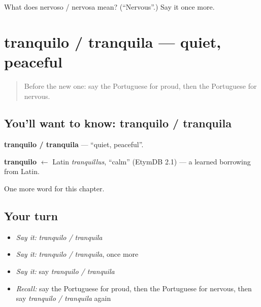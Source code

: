 \begin{tcolorbox}[breakable,colback=teal!4,colframe=teal!35!black,title={Before you move on}]
What does nervoso / nervosa mean? (\textquotedblleft{}Nervous\textquotedblright{}.) Say it once more.
\end{tcolorbox}
\section[tranquilo / tranquila]{tranquilo / tranquila — quiet, peaceful}

\label{lesson:PT-C215-tranquilo-tranquila}



\begin{quote}
Before the new one: say the Portuguese for proud, then the Portuguese for nervous.
\end{quote}

\subsection*{You'll want to know: tranquilo / tranquila}
\textbf{tranquilo / tranquila} — \textquotedblleft{}quiet, peaceful\textquotedblright{}.

\begin{cousinweb}
\textbf{tranquilo} $\leftarrow$ Latin \emph{tranquillus}, \textquotedblleft{}calm\textquotedblright{} (EtymDB 2.1) — a learned borrowing from Latin.
\end{cousinweb}

\begin{grammarlens}[title={What you've built}]
One more word for this chapter.
\end{grammarlens}

\subsection*{Your turn}
\begin{itemize}
\raggedright
  \item \emph{Say it:} \emph{tranquilo / tranquila}
  \item \emph{Say it:} \emph{tranquilo / tranquila}, once more
  \item \emph{Say it:} say \emph{tranquilo / tranquila}
  \item \emph{Recall:} say the Portuguese for proud, then the Portuguese for nervous, then say \emph{tranquilo / tranquila} again
\end{itemize}

